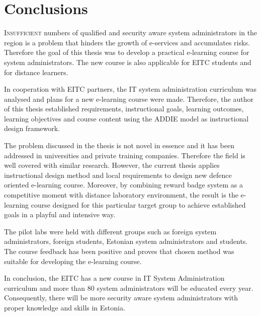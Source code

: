 \chapter{Conclusions}
\label{conclusion}
\lettrine[lraise=0.1, nindent=0em, slope=-.5em]{\color{Violet}I}{nsufficient}  numbers of qualified and security aware system administrators in the region is a problem that hinders the growth of e-services and accumulates risks. Therefore the goal of this thesis was to develop a practical e-learning course for system administrators. The new course is also applicable for \gls{EITC} students and for distance learners. 

In cooperation with \gls{EITC} partners, the IT system administration curriculum was analysed and plans for a new e-learning course were made. Therefore, the author of this thesis established requirements, instructional goals, learning outcomes, learning objectives and course content using the \gls{ADDIE} model as instructional design framework.

The problem discussed in the thesis is not novel in essence and it has been addressed in universities and private training companies. Therefore the field is well covered with similar research. However, the current thesis applies instructional design method and local requirements to design new defence oriented e-learning course. Moreover, by combining reward badge system as a competitive moment with distance laboratory environment, the result is the e-learning course designed for this particular target group to achieve established goals in a playful and intensive way.

The pilot labs were held with different groups such as foreign system administrators, foreign students, Estonian system administrators and students. The course feedback has been positive and proves that chosen method was suitable for developing the e-learning course.


In conclusion, the \gls{EITC} has a new course in IT System Administration curriculum and more than 80 system administrators will be educated every year. Consequently,  there will be more security aware system administrators with proper knowledge and skills in Estonia.
